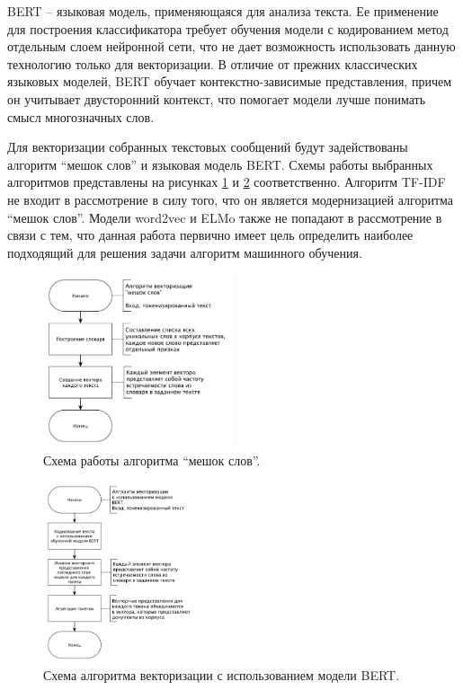 BERT \cite{bert} -- языковая модель, применяющаяся для анализа текста. Ее применение для построения классификатора требует обучения модели с кодированием метод отдельным слоем нейронной сети, что не дает возможность использовать данную технологию только для векторизации.
В отличие от прежних классических языковых моделей, BERT обучает контекстно-зависимые представления, причем он учитывает двусторонний контекст, что помогает модели лучше понимать смысл многозначных слов. \cite{vectorizations}

Для векторизации собранных текстовых сообщений будут задействованы алгоритм ``мешок слов'' и языковая модель BERT.
Схемы работы выбранных алгоритмов представлены на рисунках \ref{img:schemeBagOfWords} и \ref{img:schemeBert} соответственно.
Алгоритм TF-IDF не входит в рассмотрение в силу того, что он является модернизацией алгоритма ``мешок слов''. 
Модели word2vec и ELMo также не попадают в рассмотрение в связи с тем, что данная работа первично имеет цель определить наиболее подходящий для решения задачи алгоритм машинного обучения.

\begin{figure}[H]
	\centering
	\includegraphics[width=0.5\textwidth]{inc/schemeBagOfWords.pdf}
	\caption{ Схема работы алгоритма ``мешок слов''. }
	\label{img:schemeBagOfWords}
\end{figure}

\begin{figure}[H]
	\centering
	\includegraphics[width=0.4\textwidth]{inc/schemeBert.pdf}
	\caption{ Схема алгоритма векторизации с использованием модели BERT. }
	\label{img:schemeBert}
\end{figure}

